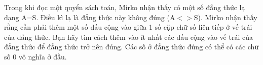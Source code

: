 Trong khi đọc một quyển sách toán, Mirko nhận thấy có một số đẳng thức lạ dạng A=S. Điều kì lạ là đẳng thức này không đúng (A$<$$>$S). Mirko nhận thấy rằng cần phải thêm một số dấu cộng vào giữa 1 số cặp chữ số liên tiếp ở vế trái của đẳng thức. Bạn hãy tìm cách thêm vào ít nhất các dấu cộng vào vế trái của đẳng thức để đẳng thức trở nên đúng. Các số ở đẳng thức đúng có thể có các chữ số 0 vô nghĩa ở đầu.  

\